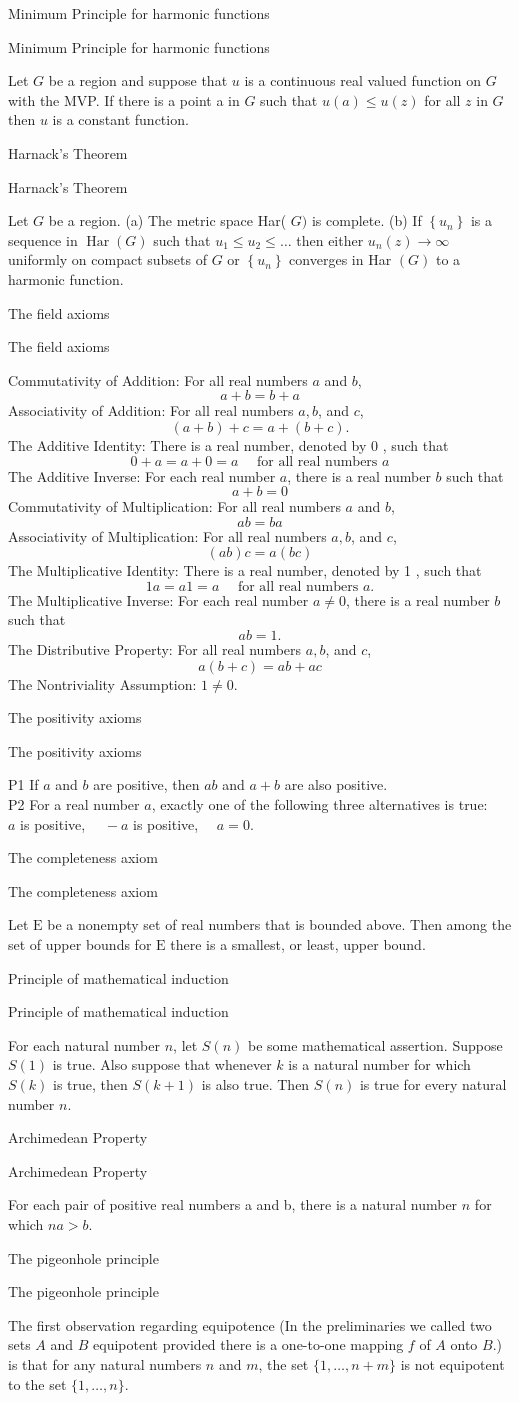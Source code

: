 \documentclass[17pt]{extarticle}
\newcommand{\boxset}[2]{\begin{mdframed}[style=darkQuesion]
#1
\end{mdframed}
\newpage
\begin{mdframed}[style=darkQuesion]
#1
  \end{mdframed}
\begin{mdframed}[style=darkAnswer]
#2
  \end{mdframed}
  \newpage
}
\begin{document}
\boxset{Minimum Principle for harmonic functions}
{Let $G$ be a region and suppose that $u$ is a continuous real valued function on $G$ with the MVP. If there is a point a in $G$ such that $u(a) \leq u(z)$ for all $z$ in $G$ then $u$ is a constant function.}%
\boxset{Harnack's Theorem}
{Let $G$ be a region. (a) The metric space Har( $G)$ is complete. (b) If $\left\{u_{n}\right\}$ is a sequence in $\operatorname{Har}(G)$ such that $u_{1} \leq u_{2} \leq \ldots$ then either $u_{n}(z) \rightarrow \infty$ uniformly on compact subsets of $G$ or $\left\{u_{n}\right\}$ converges in Har $(G)$ to a harmonic function.}%
\boxset{The field axioms}
{
Commutativity of Addition: For all real numbers $a$ and $b$,
\[
a+b=b+a
\]
Associativity of Addition: For all real numbers $a, b$, and $c$,
\[
(a+b)+c=a+(b+c) .
\]
The Additive Identity: There is a real number, denoted by 0 , such that
\[
0+a=a+0=a \quad \text { for all real numbers } a
\]
The Additive Inverse: For each real number $a$, there is a real number $b$ such that
\[
a+b=0
\]
Commutativity of Multiplication: For all real numbers $a$ and $b$,
\[
a b=b a
\]
Associativity of Multiplication: For all real numbers $a, b$, and $c$,
\[
(a b) c=a(b c)
\]
The Multiplicative Identity: There is a real number, denoted by 1 , such that
\[
1 a=a 1=a \quad \text { for all real numbers } a .
\]
The Multiplicative Inverse: For each real number $a \neq 0$, there is a real number $b$ such that
\[
a b=1 .
\]
The Distributive Property: For all real numbers $a, b$, and $c$,
\[
a(b+c)=a b+a c
\]
The Nontriviality Assumption:
$1 \neq 0 .$
}%
\boxset{The positivity axioms}
{
P1 If $a$ and $b$ are positive, then $a b$ and $a+b$ are also positive.\[\ \]
P2 For a real number $a$, exactly one of the following three alternatives is true:\[\ \]
$a$ is positive, $\quad-a$ is positive, $\quad a=0 .$
}%
\boxset{The completeness axiom}
{
Let $\mathrm{E}$ be a nonempty set of real numbers that is bounded above. Then among the set of upper bounds for $\mathrm{E}$ there is a smallest, or least, upper bound.
}%
\boxset{Principle of mathematical induction}
{
For each natural number $n$, let $S(n)$ be some mathematical assertion. Suppose $S(1)$ is true. Also suppose that whenever $k$ is a natural number for which $S(k)$ is true, then $S(k+1)$ is also true. Then $S(n)$ is true for every natural number $n$.
}%
\boxset{Archimedean Property}
{
For each pair of positive real numbers a and b, there is a natural number $n$ for which $n a>b$.
}%
\boxset{The pigeonhole principle}
{
The first observation regarding equipotence
(In the preliminaries we called two sets $A$ and $B$ equipotent provided there is a one-to-one mapping $f$ of $A$ onto $B$.)
is that for any natural numbers $n$ and $m$, the set $\{1, \ldots, n+m\}$ is not equipotent to the set $\{1, \ldots, n\}$.
}%
\end{document}
